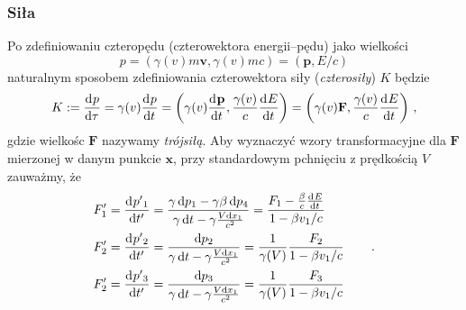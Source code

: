 \documentclass[../main.tex]{subfiles}
\begin{document}
\subsubsection{Siła}
Po zdefiniowaniu czteropędu (czterowektora energii--pędu) jako wielkości
\begin{equation*}
    p=(\gamma(v)m\mathbf{v},\gamma(v)mc)=(\mathbf{p},E/c)
\end{equation*}
naturalnym sposobem zdefiniowania czterowektora siły (\textit{czterosiły}) \(K\) będzie
\begin{equation*}
    K:=\dv[]{p}{\tau}=\gamma(v)\dv[]{p}{t}=\left(\gamma(v)\dv[]{\mathbf{p}}{t},\frac{\gamma(v)}{c}\dv[]{E}{t}\right)=\left(\gamma(v)\mathbf{F},\frac{\gamma(v)}{c}\dv[]{E}{t}\right)\,,
\end{equation*}
gdzie wielkośc \(\mathbf{F}\) nazywamy \textit{trójsiłą}. Aby wyznaczyć wzory transformacyjne dla \(\mathbf{F}\) mierzonej w danym punkcie \(\mathbf{x}\), przy standardowym pchnięciu z prędkością \(V\)zauważmy, że
\begin{equation*}
\begin{split}
    &F_1'=\dv[]{p{'}_1}{t{'}}=\frac{\gamma\dd{p_1}-\gamma\beta\dd{p_4}}{\gamma\dd{t}-\gamma\frac{V\dd{x_1}}{c^2}}=\frac{F_1-\frac{\beta}{c}\dv[]{E}{t}}{1-\beta v_1/c}\\
    &F_2'=\dv[]{p{'}_2}{t{'}}=\frac{\dd{p_2}}{\gamma\dd{t}-\gamma\frac{V\dd{x_1}}{c^2}}=\frac{1}{\gamma(V)}\frac{F_2}{1-\beta v_1/c}\\
    &F_2'=\dv[]{p{'}_3}{t{'}}=\frac{\dd{p_3}}{\gamma\dd{t}-\gamma\frac{V\dd{x_1}}{c^2}}=\frac{1}{\gamma(V)}\frac{F_3}{1-\beta v_1/c}
\end{split}\quad\quad\,.
\end{equation*}
\end{document}
